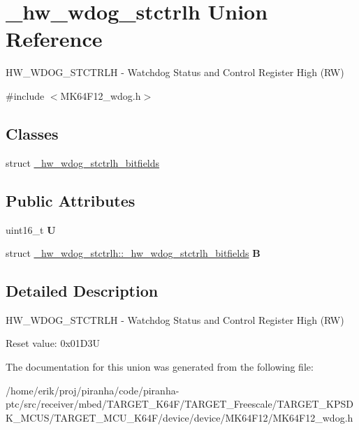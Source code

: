 \hypertarget{union__hw__wdog__stctrlh}{}\section{\+\_\+hw\+\_\+wdog\+\_\+stctrlh Union Reference}
\label{union__hw__wdog__stctrlh}


H\+W\+\_\+\+W\+D\+O\+G\+\_\+\+S\+T\+C\+T\+R\+LH -\/ Watchdog Status and Control Register High (RW)  




{\ttfamily \#include $<$M\+K64\+F12\+\_\+wdog.\+h$>$}

\subsection*{Classes}
\begin{DoxyCompactItemize}
\item 
struct \hyperlink{struct__hw__wdog__stctrlh_1_1__hw__wdog__stctrlh__bitfields}{\+\_\+hw\+\_\+wdog\+\_\+stctrlh\+\_\+bitfields}
\end{DoxyCompactItemize}
\subsection*{Public Attributes}
\begin{DoxyCompactItemize}
\item 
uint16\+\_\+t {\bfseries U}\hypertarget{union__hw__wdog__stctrlh_acebcc8d0e760b5cd83ade14e5a1241a8}{}\label{union__hw__wdog__stctrlh_acebcc8d0e760b5cd83ade14e5a1241a8}

\item 
struct \hyperlink{struct__hw__wdog__stctrlh_1_1__hw__wdog__stctrlh__bitfields}{\+\_\+hw\+\_\+wdog\+\_\+stctrlh\+::\+\_\+hw\+\_\+wdog\+\_\+stctrlh\+\_\+bitfields} {\bfseries B}\hypertarget{union__hw__wdog__stctrlh_acbfda8cff491cf6d07a87ad56133c600}{}\label{union__hw__wdog__stctrlh_acbfda8cff491cf6d07a87ad56133c600}

\end{DoxyCompactItemize}


\subsection{Detailed Description}
H\+W\+\_\+\+W\+D\+O\+G\+\_\+\+S\+T\+C\+T\+R\+LH -\/ Watchdog Status and Control Register High (RW) 

Reset value\+: 0x01\+D3U 

The documentation for this union was generated from the following file\+:\begin{DoxyCompactItemize}
\item 
/home/erik/proj/piranha/code/piranha-\/ptc/src/receiver/mbed/\+T\+A\+R\+G\+E\+T\+\_\+\+K64\+F/\+T\+A\+R\+G\+E\+T\+\_\+\+Freescale/\+T\+A\+R\+G\+E\+T\+\_\+\+K\+P\+S\+D\+K\+\_\+\+M\+C\+U\+S/\+T\+A\+R\+G\+E\+T\+\_\+\+M\+C\+U\+\_\+\+K64\+F/device/device/\+M\+K64\+F12/M\+K64\+F12\+\_\+wdog.\+h\end{DoxyCompactItemize}
